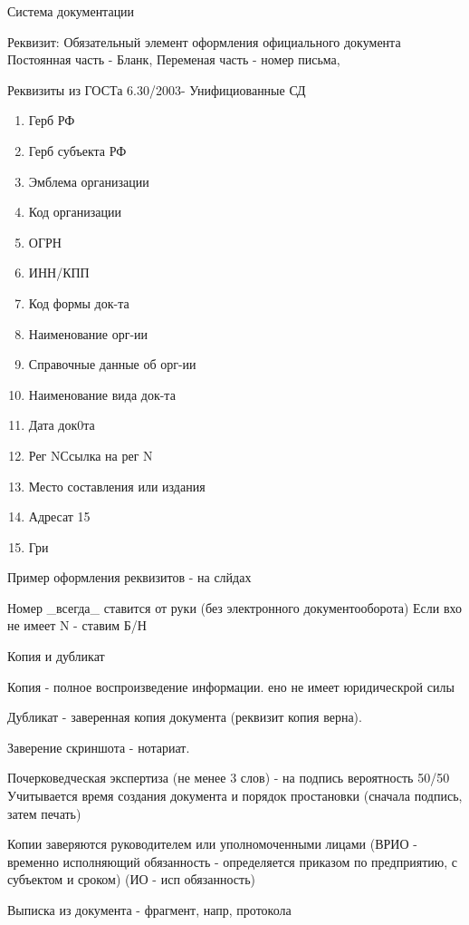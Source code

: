 \documentclass[a4paper,12pt]{report}
\begin{document}
			Система документации




		Реквизит:
			Обязательный элемент оформления официального документа
			Постоянная часть - Бланк,
			Переменая часть - номер письма,


		Реквизиты из ГОСТа 6.30/2003- Унифициованные СД
		\begin{enumerate}
		\item	Герб РФ
		\item	Герб субъекта РФ
		\item	Эмблема организации
		\item	Код организации
		\item	ОГРН
		\item	ИНН/КПП
		\item	Код формы док-та
		\item	Наименование орг-ии
		\item	Справочные данные об орг-ии
		\item	Наименование вида док-та
		\item	Дата док0та
		\item	Рег NСсылка на рег N
		\item	Место составления или издания
		\item	Адресат 15
		\item	Гри
		\end{enumerate}



		Пример оформления реквизитов - на слйдах

		Номер _всегда_ ставится от руки (без электронного документооборота)
		Если вхо не имеет N - ставим Б/Н



		Копия и дубликат

		Копия - полное воспроизведение информации. ено не имеет юридическрой силы

		Дубликат -  заверенная копия документа (реквизит копия верна).

		Заверение скриншота - нотариат.


		Почерковедческая экспертиза (не менее 3 слов) - на подпись вероятность 50/50
		Учитывается время создания документа и порядок простановки (сначала подпись, затем печать)

		Копии заверяются руководителем или уполномоченными лицами (ВРИО - временно исполняющий обязанность - определяется приказом по предприятию, с субъектом и сроком) (ИО - исп обязанность)

		Выписка из документа - фрагмент, напр, протокола
\end{document}
